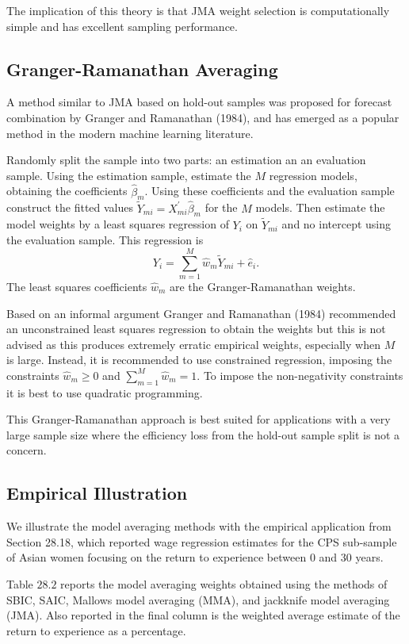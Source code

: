 \documentclass[10pt]{article}
\begin{document}
The implication of this theory is that JMA weight selection is computationally simple and has excellent sampling performance.

\subsection{Granger-Ramanathan Averaging}
A method similar to JMA based on hold-out samples was proposed for forecast combination by Granger and Ramanathan (1984), and has emerged as a popular method in the modern machine learning literature.

Randomly split the sample into two parts: an estimation an an evaluation sample. Using the estimation sample, estimate the $M$ regression models, obtaining the coefficients $\widehat{\beta}_{m}$. Using these coefficients and the evaluation sample construct the fitted values $\widetilde{Y}_{m i}=X_{m i}^{\prime} \widehat{\beta}_{m}$ for the $M$ models. Then estimate the model weights by a least squares regression of $Y_{i}$ on $\widetilde{Y}_{m i}$ and no intercept using the evaluation sample. This regression is
$$
Y_{i}=\sum_{m=1}^{M} \widehat{w}_{m} \widetilde{Y}_{m i}+\widehat{e}_{i} .
$$
The least squares coefficients $\widehat{w}_{m}$ are the Granger-Ramanathan weights.

Based on an informal argument Granger and Ramanathan (1984) recommended an unconstrained least squares regression to obtain the weights but this is not advised as this produces extremely erratic empirical weights, especially when $M$ is large. Instead, it is recommended to use constrained regression, imposing the constraints $\widehat{w}_{m} \geq 0$ and $\sum_{m=1}^{M} \widehat{w}_{m}=1$. To impose the non-negativity constraints it is best to use quadratic programming.

This Granger-Ramanathan approach is best suited for applications with a very large sample size where the efficiency loss from the hold-out sample split is not a concern.

\subsection{Empirical Illustration}
We illustrate the model averaging methods with the empirical application from Section 28.18, which reported wage regression estimates for the CPS sub-sample of Asian women focusing on the return to experience between 0 and 30 years.

Table $28.2$ reports the model averaging weights obtained using the methods of SBIC, SAIC, Mallows model averaging (MMA), and jackknife model averaging (JMA). Also reported in the final column is the weighted average estimate of the return to experience as a percentage.
\end{document}
